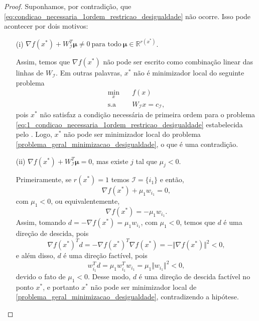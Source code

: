 \documentclass[12pt,a4paper]{scrartcl}
\def\RR{\mathds{R}}
\theoremstyle{definition}%
\begin{document}
\begin{proof}
Suponhamos, por contradição, que \eqref{eq:condicao_necessaria_1ordem_restricao_desigualdade} não ocorre. Isso pode acontecer por dois motivos:
\begin{enumerate}
\item[(i)] $\nabla f(x^{*}) + W_{\mathcal{I}}^{T} \boldsymbol{\mu} \neq 0 \ \text{para todo} \ \boldsymbol{\mu} \in \RR^{r(x^{*})}$.

Assim, temos que $\nabla f(x^{*})$ não pode ser escrito como combinação linear das linhas de $W_{\mathcal{I}}$. Em outras palavras, $x^{*}$ não é minimizador local do seguinte problema
\[ \label{eq:1_condicao_necessaria_1ordem_restricao_desigualdade}
\begin{aligned}
\min_{x} & \quad f(x) \\
\text{s.a} & \quad W_{\mathcal{I}}x=c_{\mathcal{I}} ,
\end{aligned}
\]
pois $x^{*}$ não satisfaz a condição necessária de primeira ordem para o problema \eqref{eq:1_condicao_necessaria_1ordem_restricao_desigualdade} estabelecida pelo . Logo, $x^{*}$ não pode ser minimizador local do problema \eqref{problema_geral_minimizacao_desigualdade}, o que é uma contradição.

\item[(ii)] $\nabla f(x^{*}) + W_{\mathcal{I}}^{T} \boldsymbol{\mu} = 0$, mas existe $j$ tal que $\mu_{j} <0$.

Primeiramente, se $r(x^{*}) = 1$ temos $\mathcal{I} = \{ i_{1} \}$ e então, 
\[
\nabla f(x^{*}) + \mu_{1} w_{i_{1}} =0 ,
\]
com $\mu_{1} <0$, ou equivalentemente, 
\[
\nabla f(x^{*}) = - \mu_{1} w_{i_{1}} .
\]
Assim, tomando $d=-\nabla f(x^{*}) = \mu_{1} w_{i_{1}}$, com $\mu_{1} <0$, temos que $d$ é uma direção de descida, pois
\[
\nabla f(x^{*})^{T}d = -\nabla f(x^{*})^{T} \nabla f(x^{*}) = -\Vert \nabla f(x^{*}) \Vert^{2} <0,
\]
e além disso, $d$ é uma direção factível, pois
\[
w_{i_{1}}^{T}d = \mu_{1} w_{i_{1}}^{T}w_{i_{1}} = \mu_{1} \Vert w_{i_{1}} \Vert^{2} < 0,
\]
devido o fato de $\mu_{1} <0$. Desse modo, $d$ é uma direção de descida factível no ponto $x^{*}$, e portanto $x^{*}$ não pode ser minimizador local de \eqref{problema_geral_minimizacao_desigualdade}, contradizendo a hipótese.


\end{enumerate}
\end{proof}
\end{document}
